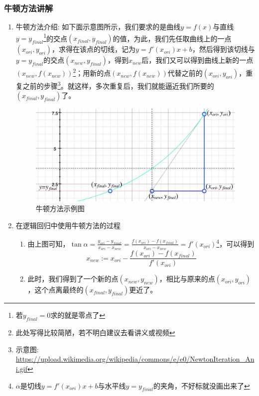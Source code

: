 \subsubsection{牛顿方法讲解}
\begin{enumerate}
	\item 牛顿方法介绍: 如下面示意图所示，我们要求的是曲线$y=f(x)$与直线$y=y_{final}$\footnote{若$y_{final}=0$求的就是零点了}的交点$(x_{final}, y_{final})$的值，为此，我们先任取曲线上的一点$(x_{ori}, y_{ori})$，求得在该点的切线，记为$y=f'(x_{ori})x + b$，然后得到该切线与$y=y_{final}$的交点$(x_{new}, y_{final})$，得到$x_{new}$后，我们又可以得到曲线上新的一点$(x_{new}, f(x_{new}))$\footnote{此处写得比较简陋，若不明白建议去看讲义或视频}；用新的点$(x_{new}, f(x_{new}))$代替之前的$(x_{ori}, y_{ori})$，重复之前的步骤\footnote{示意图: \url{https://upload.wikimedia.org/wikipedia/commons/e/e0/NewtonIteration_Ani.gif}}。就这样，多次重复后，我们就能逼近我们所要的$(x_{final}, y_{final})$了。
	\begin{figure}[htbp]
		\centering
		\includegraphics[scale=0.5]{images/牛顿方法示例图片}
		\caption{牛顿方法示例图}
	\end{figure}

	\item 在逻辑回归中使用牛顿方法的过程
	\begin{enumerate}
		\item 由上图可知，$\tan\alpha = \frac{y_{ori}-y_{final}}{x_{ori}-x_{new}} = \frac{f(x_{ori})-f(x_{final})}{x_{ori}-x_{new}} = f'(x_{ori})$\footnote{$\alpha$是切线$y=f'(x_{ori})x + b$与水平线$y=y_{final}$的夹角，不好标就没画出来了}，可以得到
		\begin{equation}
			x_{new} := x_{ori} - \frac{f(x_{ori})-f(x_{final})}{f'(x_{ori})}
		\end{equation}
		
		\item 此时，我们得到了一个新的点$(x_{new}, y_{new})$，相比与原来的点$(x_{ori},y_{ori})$，这个点离最终的$(x_{final}, y_{final})$更近了。


\end{enumerate}
\end{enumerate}

